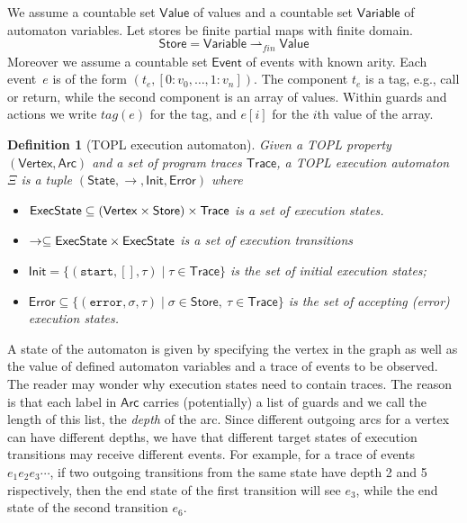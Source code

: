 \documentclass{sigplanconf}[10pt] %
\newcommand{\pmap}{\rightharpoonup}
\newcommand{\set}[1]{\ensuremath{\mathsf{#1}}}
\newtheorem{definition}{Definition}
\begin{document}
We assume a countable set \set{Value} of values and a countable set $\set{Variable}$ of automaton variables. Let stores be finite partial maps with finite domain.
\[
\set{Store} = \set{Variable} \pmap_{\mathit{fin}} \set{Value}
\]
Moreover we assume a countable set \set{Event} of events with known arity. Each event~$e$ is of the form $(t_e,[0: v_0,\dots, 1:v_n])$.
The component $t_e$ is a tag, e.g., call or return, while the second component is an array of values.
Within guards and actions we write $tag(e)$ for the tag, and $e[i]$ for the $i$th value of the array.
%
\begin{definition}[TOPL execution automaton]
Given a TOPL property $(\set{Vertex},\set{Arc})$ and a set of program traces $\set{Trace}$, a {\em TOPL execution automaton} $\Xi$ is a tuple 
$(\set{State}, \to , \set{Init}, \set{Error})$ where
\begin{itemize}
\item $\set{\World} \subseteq (\set{Vertex}\times \set{Store})\times\set{Trace}$ is a set of {\em execution states}.
\item $\to \subseteq \set{\World} \times \set{\World}$ is a set of {\em execution transitions}
\item $\set{Init}= \{ (\texttt{start}, [], \tau) \mid \tau \in \set{Trace} \}$ is the set of initial execution states;
\item $\set{Error} \subseteq \{ (\texttt{error}, \sigma, \tau) \mid \sigma \in \set{Store},  \ \tau \in \set{Trace} \}$ is the set of accepting (error) execution states.
\end{itemize} 
\end{definition}
A state of the automaton is
given by specifying the vertex in the graph as well as the value of defined automaton variables and a trace of events to be
observed. The reader may wonder why execution states need to contain traces. The reason is that
each label in $\set{Arc}$ carries (potentially) a list of guards and 
we call the length of this list, the \emph{depth} of the arc.
Since different outgoing arcs for a vertex can have different depths, we have that 
different target states of execution transitions may receive different events.
For example, for a trace of events $e_1 e_2 e_3\cdots$, if two outgoing transitions from the same state have
depth 2 and 5 rispectively,
then the end state of the first transition will see $e_3$, while the end state of the second transition $e_6$. 
\end{document}
